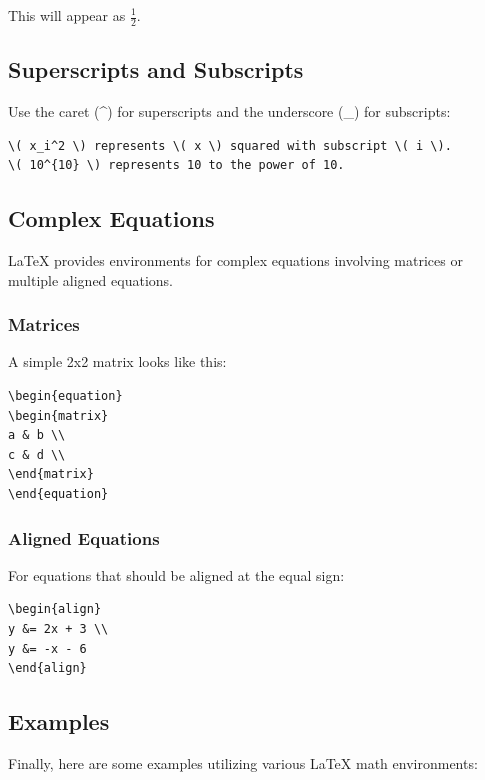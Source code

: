 \documentclass[12pt,journal,compsoc]{IEEEtran}
\begin{document}
This will appear as \( \frac{1}{2} \). 

\subsection{Superscripts and Subscripts}
Use the caret (^) for superscripts and the underscore (_) for subscripts:

\begin{verbatim}
\( x_i^2 \) represents \( x \) squared with subscript \( i \).
\( 10^{10} \) represents 10 to the power of 10.
\end{verbatim}

\subsection{Complex Equations}
LaTeX provides environments for complex equations involving matrices or multiple aligned equations.

\subsubsection{Matrices}
A simple 2x2 matrix looks like this:

\begin{verbatim}
\begin{equation}
\begin{matrix}
a & b \\
c & d \\
\end{matrix}
\end{equation}
\end{verbatim}

\subsubsection{Aligned Equations}
For equations that should be aligned at the equal sign:

\begin{verbatim}
\begin{align}
y &= 2x + 3 \\
y &= -x - 6
\end{align}
\end{verbatim}

\subsection{Examples}
Finally, here are some examples utilizing various LaTeX math environments:
\end{document}
